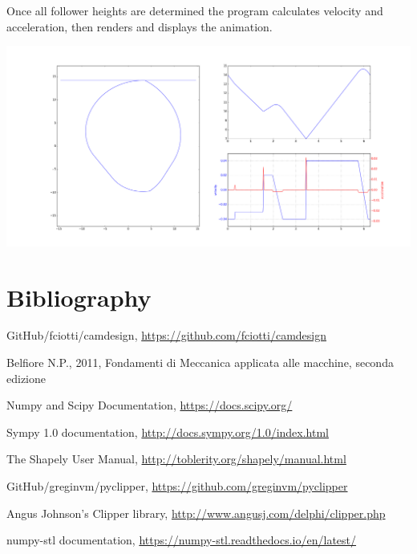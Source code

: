 \documentclass[a4paper,10pt,twoside]{article}
\begin{document}
    Once all follower heights are determined the program calculates velocity and acceleration,
    then renders and displays the animation.

    \includegraphics[width=\textwidth]{sim.png}

\clearpage
\section{Bibliography}
    \begin{enumerate}[label={[\arabic*]},labelsep=1cm,leftmargin=*]
        \item GitHub/fciotti/camdesign, \url{https://github.com/fciotti/camdesign}
        \item Belfiore N.P., 2011, Fondamenti di Meccanica applicata alle macchine, seconda edizione
        \item Numpy and Scipy Documentation, \url{https://docs.scipy.org/}
        \item Sympy 1.0 documentation, \url{http://docs.sympy.org/1.0/index.html}
        \item The Shapely User Manual, \url{http://toblerity.org/shapely/manual.html}
        \item GitHub/greginvm/pyclipper, \url{https://github.com/greginvm/pyclipper}
        \item Angus Johnson's Clipper library, \url{http://www.angusj.com/delphi/clipper.php}
        \item numpy-stl documentation, \url{https://numpy-stl.readthedocs.io/en/latest/}
    \end{enumerate}

%
\end{document}
